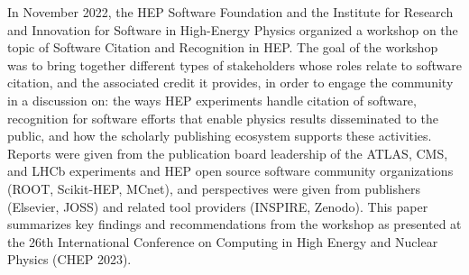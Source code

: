 In November 2022, the HEP Software Foundation and the Institute for Research and Innovation for Software in High-Energy Physics organized a workshop on the topic of Software Citation and Recognition in HEP.
The goal of the workshop was to bring together different types of stakeholders whose roles relate to software citation, and the associated credit it provides, in order to engage the community in a discussion on: the ways HEP experiments handle citation of software, recognition for software efforts that enable physics results disseminated to the public, and how the scholarly publishing ecosystem supports these activities.
Reports were given from the publication board leadership of the ATLAS, CMS, and LHCb experiments and HEP open source software community organizations (ROOT, Scikit-HEP, MCnet), and perspectives were given from publishers (Elsevier, JOSS) and related tool providers (INSPIRE, Zenodo).
This paper summarizes key findings and recommendations from the workshop as presented at the 26th International Conference on Computing in High Energy and Nuclear Physics (CHEP 2023).

